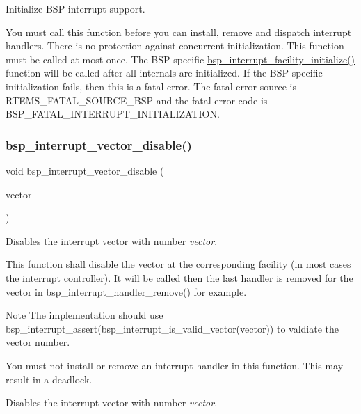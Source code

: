 Initialize B\+SP interrupt support. 

You must call this function before you can install, remove and dispatch interrupt handlers. There is no protection against concurrent initialization. This function must be called at most once. The B\+SP specific \mbox{\hyperlink{group__bsp__interrupt_gab114a6e92b17b99bf52cf24d1125a9df}{bsp\+\_\+interrupt\+\_\+facility\+\_\+initialize()}} function will be called after all internals are initialized. If the B\+SP specific initialization fails, then this is a fatal error. The fatal error source is R\+T\+E\+M\+S\+\_\+\+F\+A\+T\+A\+L\+\_\+\+S\+O\+U\+R\+C\+E\+\_\+\+B\+SP and the fatal error code is B\+S\+P\+\_\+\+F\+A\+T\+A\+L\+\_\+\+I\+N\+T\+E\+R\+R\+U\+P\+T\+\_\+\+I\+N\+I\+T\+I\+A\+L\+I\+Z\+A\+T\+I\+ON. \mbox{\label{group__bsp__interrupt_ga5428b914d0cb037e9b3f7cb2b758cabd}} 
\subsubsection{\texorpdfstring{bsp\_interrupt\_vector\_disable()}{bsp\_interrupt\_vector\_disable()}}
{\footnotesize\ttfamily void bsp\+\_\+interrupt\+\_\+vector\+\_\+disable (\begin{DoxyParamCaption}\item[{\mbox{\hyperlink{group__ClassicINTR_ga3e434c197d99f128e78cae4d9358bd8b}{rtems\+\_\+vector\+\_\+number}}}]{vector }\end{DoxyParamCaption})}



Disables the interrupt vector with number {\itshape vector}. 

This function shall disable the vector at the corresponding facility (in most cases the interrupt controller). It will be called then the last handler is removed for the vector in bsp\+\_\+interrupt\+\_\+handler\+\_\+remove() for example.

\begin{DoxyNote}{Note}
The implementation should use bsp\+\_\+interrupt\+\_\+assert(bsp\+\_\+interrupt\+\_\+is\+\_\+valid\+\_\+vector(vector)) to valdiate the vector number.

You must not install or remove an interrupt handler in this function. This may result in a deadlock.
\end{DoxyNote}
Disables the interrupt vector with number {\itshape vector}.


